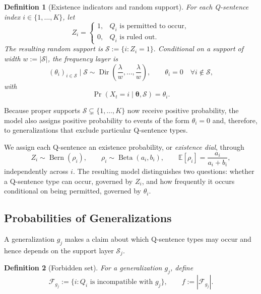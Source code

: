 \documentclass[10pt, conference, letterpaper]{ IEEEtran}
\theoremstyle{bfnote}
\newtheorem{definition}{Definition}
\begin{document}
\begin{definition}[Existence indicators and random support]
\label{def:rsdc-support}
For each Q-sentence index $i\in\{1,\ldots,K\}$, let
\[
    Z_i
    =
    \begin{cases}
        1, & Q_i\text{ is permitted to occur},\\
        0, & Q_i\text{ is ruled out}.
    \end{cases}
\]
The resulting random support is
$
    \mathcal{S}
    :=
    \{i:Z_i=1\}.
$
Conditional on a support of width $w:=|\mathcal{S}|$, the frequency layer is
\begin{equation}
\label{eq:rsdc-hintikka}
(\theta_i)_{i\in\mathcal{S}}
\mid\mathcal{S}
\sim
\operatorname{Dir}\!\left(
    \frac{\lambda}{w},\ldots,\frac{\lambda}{w}
\right),
\qquad
\theta_i=0
\quad\forall i\notin\mathcal{S},
\end{equation}
with
\[
    \Pr(X_t=i\mid\boldsymbol{\theta},\mathcal{S})
    =
    \theta_i.
\]
\end{definition}

Because proper supports $\mathcal{S}\subsetneq\{1,\ldots,K\}$ now receive
positive probability, the model also assigns positive probability to
events of the form $\theta_i=0$ and, therefore, to generalizations that
exclude particular Q-sentence types.

We assign each Q-sentence an existence probability, or \emph{existence
dial}, through
\begin{equation}
\label{eq:rsdc-dials}
Z_i\sim\operatorname{Bern}(\rho_i),
\qquad
\rho_i\sim\operatorname{Beta}(a_i,b_i),
\qquad
\mathbb{E}[\rho_i]
=
\frac{a_i}{a_i+b_i},
\end{equation}
independently across $i$. The resulting model distinguishes two questions:
whether a Q-sentence type can occur, governed by $Z_i$, and how frequently
it occurs conditional on being permitted, governed by $\theta_i$.

\subsection{Probabilities of Generalizations}
\label{subsec:rsdc-gen}

A generalization $g_j$ makes a claim about which Q-sentence types may occur and
hence depends on the support layer $\mathcal{S}_j$.

\begin{definition}[Forbidden set]
\label{def:rsdc-forbidden}
For a generalization $g_j$, define
\begin{equation}
\label{eq:rsdc-forbidden}
\mathcal{F}_{g_j}
:=
\{i:Q_i\text{ is incompatible with }g_j\},
\qquad
f:=|\mathcal{F}_{g_j}|.
\end{equation}
\end{definition}
\end{document}
